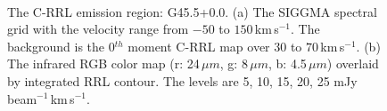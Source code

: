 \documentclass[manuscript]{aastex61}
\newcommand{\kms}{\,km\,s$^{-1}$}
\newcommand{\um}{\mu m}
\begin{document}
\begin{figure}[H]
	\centering
	\\ 
	\caption{The C-RRL emission region: G45.5+0.0.
	(a) The SIGGMA spectral grid with the velocity range from $-50$ to $150$\kms.
	The background is the 0$^{th}$ moment C-RRL map over $30$ to $70$\kms.
	(b) The infrared RGB color map (r: 24\,$\um$, g: 8\,$\um$, b: 4.5\,$\um$) overlaid by integrated RRL contour.
	The levels are 5, 10, 15, 20, 25 mJy\,beam$^{-1}$\kms.}
	\label{fig_crrl-g455}
\end{figure}
\end{document}
